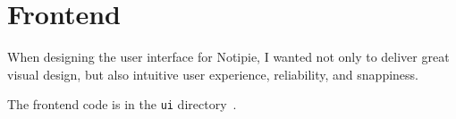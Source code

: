 \section{Frontend}\label{sec:frontend}

When designing the user interface for Notipie,
I wanted not only to deliver great visual design,
but also intuitive user experience,
reliability,
and snappiness.

The frontend code
is in the
\texttt{ui} directory~\cite{sewera_notipie_2022-5}.







